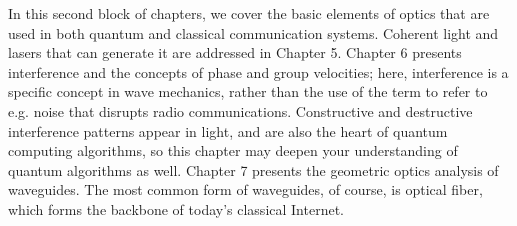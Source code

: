 
\begin{partintro}

In this second block of chapters, we cover the basic elements of optics that are used in both quantum and classical communication systems. Coherent light and lasers that can generate it are addressed in Chapter 5. Chapter 6 presents interference and the concepts of phase and group velocities; here, interference is a specific concept in wave mechanics, rather than the use of the term to refer to e.g. noise that disrupts radio communications. Constructive and destructive interference patterns appear in light, and are also the heart of quantum computing algorithms, so this chapter may deepen your understanding of quantum algorithms as well.  Chapter 7 presents the geometric optics analysis of waveguides.  The most common form of waveguides, of course, is optical fiber, which forms the backbone of today's classical Internet.
\end{partintro}
